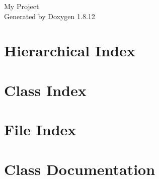 \documentclass[twoside]{book}
\newcommand{\+}{\discretionary{\mbox{\scriptsize$\hookleftarrow$}}{}{}}
\newcommand{\clearemptydoublepage}{%
  \newpage{\pagestyle{empty}\cleardoublepage}%
}
\begin{document}
\hypersetup{pageanchor=false,
             bookmarksnumbered=true,
             pdfencoding=unicode
            }
\begin{titlepage}
\vspace*{7cm}
\begin{center}%
{\Large My Project }\\
\vspace*{1cm}
{\large Generated by Doxygen 1.8.12}\\
\end{center}
\end{titlepage}
\clearemptydoublepage
{}
\tableofcontents
\clearemptydoublepage
{}
\hypersetup{pageanchor=true}

\chapter{Hierarchical Index}

\chapter{Class Index}

\chapter{File Index}

\chapter{Class Documentation}














































\end{document}
